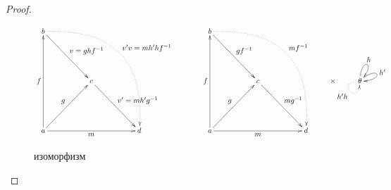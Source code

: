     \begin{proof}

        \begin{figure}[h]
            \centering
            \[\xymatrix{
                b \ar[ddrr]^{\textstyle v = ghf^{-1}} \ar@{.>}@/^4.5pc/[ddddrrrr]^{\textstyle v'v = mh'hf^{-1}}     &   &                                           &   &       &&&       b \ar[ddrr]^{\textstyle gf^{-1}} \ar@{.>}@/^4.5pc/[ddddrrrr]^{\textstyle mf^{-1}} &   &                                   &   &       &         &                                                                                                 \\
                                                                                                                    &   &                                           &   &       &&&                                                                                         &   &                                   &   &       &         &                                                                                                 \\
                                                                                                                    &   &c \ar[ddrr]^{\textstyle v' = mh'g^{-1}}    &   &       &&&                                                                                         &   &c \ar[ddrr]^{\textstyle mg^{-1}}   &   &       &\times   &     \theta \ar@(u,ur)^{\textstyle h} \ar@(ur,r)^{\textstyle h'} \ar@{.>}@(l,d)_{\textstyle h'h} \\
                                                                                                                    &   &                                           &   &       &&&                                                                                         &   &                                   &   &       &         &                                                                                                 \\
                a \ar[uuuu]^{\textstyle f} \ar[uurr]^{\textstyle g} \ar[rrrr]_{\textstyle m}                        &   &                                           &   &d      &&&       a \ar[uuuu]^{\textstyle f} \ar[uurr]^{\textstyle g} \ar[rrrr]_{\textstyle m}      &   &                                   &   &d      &         &
            }\]
            \caption{изоморфизм}
            \label{cd_groupoid_iso}
        \end{figure}
        
    \end{proof}